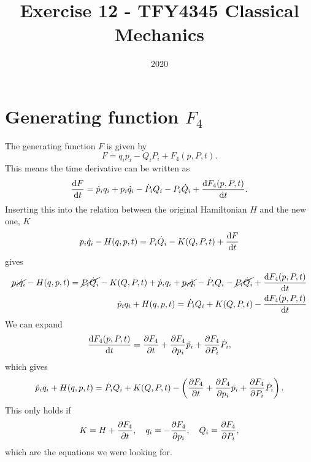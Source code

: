 \documentclass{article}
\title{Exercise 12 - TFY4345 Classical Mechanics}
\date{2020}
\begin{document}
    \maketitle
    \section{Generating function $F_4$}
    The generating function $F$ is given by
    \begin{equation*}
        F = q_ip_i - Q_iP_i + F_4(p, P, t).
    \end{equation*}
    This means the time derivative can be written as
    \begin{equation*}
        \dv{F}{t} = \dot p_i q_i + p_i \dot q_i - \dot P_i Q_i - P_i \dot Q_i + \dv{F_4(p, P, t)}{t}.
    \end{equation*}
    Inserting this into the relation between the original Hamiltonian $H$ and the new one, $K$
    \begin{equation*}
        p_i \dot q_i - H(q, p, t) = P_i \dot Q_i - K(Q, P, t) + \dv{F}{t}
    \end{equation*}
    gives
    \begin{align*}
        \cancel{p_i \dot q_i} - H(q, p, t) = \cancel{P_i \dot Q_i} - K(Q, P, t) + \dot p_i q_i + \cancel{p_i \dot q_i} - \dot P_i Q_i - \cancel{P_i \dot Q_i} + \dv{F_4(p, P, t)}{t} \\
        \dot p_i q_i  + H(q, p, t) =  \dot P_i Q_i + K(Q, P, t) - \dv{F_4(p, P, t)}{t} 
    \end{align*}
    We can expand 
    \begin{equation*}
        \dv{F_4(p, P, t)}{t} = \pdv{F_4}{t} + \pdv{F_4}{p_i} \dot p_i +  \pdv{F_4}{P_i} \dot P_i,
    \end{equation*}
    which gives
    \begin{equation*}
        \dot p_i q_i  + H(q, p, t) =  \dot P_i Q_i + K(Q, P, t) - \left(\pdv{F_4}{t} + \pdv{F_4}{p_i} \dot p_i +  \pdv{F_4}{P_i} \dot P_i\right).
    \end{equation*}
    This only holds if
    \begin{equation*}
        K = H + \pdv{F_4}{t}, \quad q_i = - \pdv{F_4}{p_i}, \quad Q_i = \pdv{F_4}{P_i},
    \end{equation*}
    which are the equations we were looking for.
        
\end{document}
